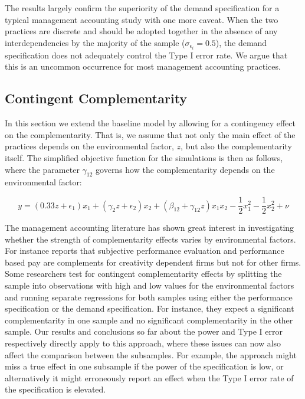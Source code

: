 \documentclass[12pt]{article}
\begin{document}
The results largely confirm the superiority of the demand specification for a typical management accounting study with one more caveat. When the two practices are discrete and should be adopted together in the absence of any interdependencies by the majority of the sample ($\sigma_{\epsilon_i} = 0.5$), the demand specification does not adequately control the Type I error rate. We argue that this is an uncommon occurrence for most management accounting practices.



\subsection{Contingent Complementarity}\label{contingent-complementarity}

In this section we extend the baseline model by allowing for a contingency effect on the complementarity. That is, we assume that not only the main effect of the practices depends on the environmental factor, $z$, but also the complementarity itself. The simplified objective function for the simulations is then as follows, where the parameter $\gamma_{12}$ governs how the complementarity depends on the environmental factor: 

\begin{equation}
\label{eq:contingent-complement}
y = (0.33 z + \epsilon_1) x_1 + (\gamma_2 z + \epsilon_2) x_2 + 
    (\beta_{12} + \gamma_{12} z) x_1 x_2 - \frac{1}{2} x^2_1 - \frac{1}{2} x^2_2 + \nu
\end{equation}

The management accounting literature has shown great interest in investigating whether the strength of complementarity effects varies by environmental factors. For instance \citet{grabner_incentive_2014} reports that subjective performance evaluation and performance based pay are complements for creativity dependent firms but not for other firms. Some researchers test for contingent complementarity effects by splitting the sample into observations with high and low values for the environmental factors and running separate regressions for both samples using either the performance specification or the demand specification. For instance, they expect a significant complementarity in one sample and no significant complementarity in the other sample. Our results and conclusions so far about the power and Type I error respectively directly apply to this approach, where these issues can now also affect the comparison between the subsamples. For example, the approach might miss a true effect in one subsample if the power of the specification is low, or alternatively it might erroneously report an effect when the Type I error rate of the specification is elevated. 
\end{document}
